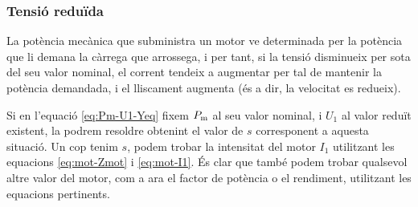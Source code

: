 \subsubsection{Tensió reduïda}
La potència mecànica que subministra un motor ve determinada per la potència que li demana la càrrega que arrossega, i per tant, si la tensió disminueix per sota del seu valor nominal, el corrent tendeix a augmentar per tal de mantenir la potència demandada, i el lliscament augmenta (és a dir, la velocitat es redueix).

Si en l'equació \eqref{eq:Pm-U1-Yeq} fixem $P_\mathrm{m}$ al seu valor nominal, i $U_1$ al valor reduït existent, la podrem resoldre obtenint el valor de $s$ corresponent  a aquesta situació. Un cop tenim $s$, podem trobar la intensitat del motor $I_1$ utilitzant les equacions \eqref{eq:mot-Zmot} i \eqref{eq:mot-I1}. És clar que també podem trobar qualsevol altre valor del motor, com a ara el factor de potència o el rendiment, utilitzant les equacions pertinents.


